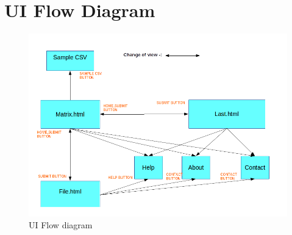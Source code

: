 \section{UI Flow Diagram}
\begin{figure}[H]
\centering \includegraphics[scale=0.55]{images/UI.png}
\caption{UI Flow diagram}
\end{figure}
